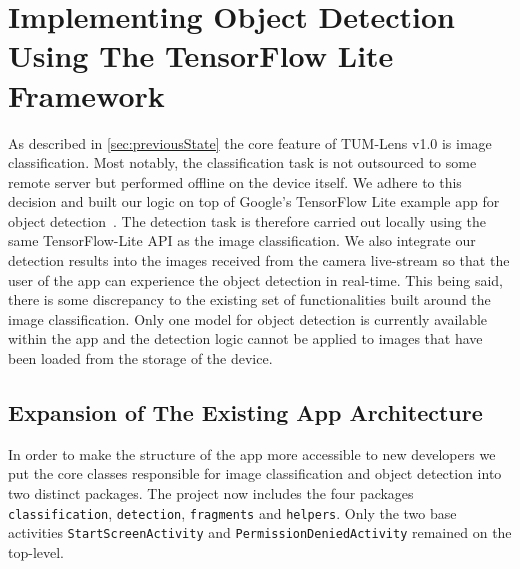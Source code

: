 \documentclass[
			   fontsize=11pt,
               paper=a4,
               bibliography=totoc,
               idxtotoc,
               headsepline,
               footsepline,
               footinclude=false,
               BCOR=12mm,
               DIV=13,
               openany,   %
               ]
               {scrbook}
\newcommand{\code}[1]{\lstinline[basicstyle = \ttfamily\small]{#1}} %
\begin{document}
\chapter{Implementing Object Detection Using The TensorFlow Lite Framework}

As described in \autoref{sec:previousState} the core feature of TUM-Lens v1.0 is image classification. Most notably, the classification task is not outsourced to some remote server but performed offline on the device itself. We adhere to this decision and built our logic on top of Google's TensorFlow Lite example app for object detection~\cite{tfSampleAppGuide, tfSampleAppRepo}. The detection task is therefore carried out locally using the same TensorFlow-Lite API as the image classification. We also integrate our detection results into the images received from the camera live-stream so that the user of the app can experience the object detection in real-time. This being said, there is some discrepancy to the existing set of functionalities built around the image classification. Only one model for object detection is currently available within the app and the detection logic cannot be applied to images that have been loaded from the storage of the device.


\section{Expansion of The Existing App Architecture}

In order to make the structure of the app more accessible to new developers we put the core classes responsible for image classification and object detection into two distinct packages. The project now includes the four packages \code{classification}, \code{detection}, \code{fragments} and \code{helpers}. Only the two base activities \code{StartScreenActivity} and \code{PermissionDeniedActivity} remained on the top-level.
\end{document}
